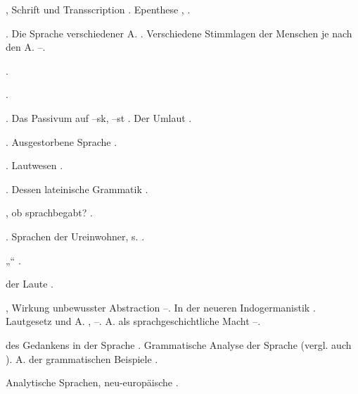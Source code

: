 \begin{register}
, Schrift und Transscription \pageref{sp.134}. Epenthese \pageref{sp.199}, \pageref{sp.401}.


. Die Sprache verschiedener A. \pageref{sp.258}. Verschiedene Stimmlagen der Menschen je nach den A. \pageref{sp.310}–\pageref{sp.311}.




 \pageref{sp.114}.

 \pageref{sp.160}.

. Das Passivum auf \mbox{–sk,} \mbox{–st} \pageref{sp.241}. Der Umlaut \pageref{sp.401}.

 \pageref{sp.114}. Ausgestorbene Sprache \pageref{sp.146}.

. Lautwesen \pageref{sp.34}.

. Dessen lateinische Grammatik \pageref{sp.106}.

, ob sprachbegabt? \pageref{sp.4}.

. Sprachen der Ureinwohner, s. .



„“ \pageref{sp.215}.

 der Laute \pageref{sp.200}.

, Wirkung unbewusster Abstraction \pageref{sp.63}–\pageref{sp.64}. In der neueren Indogermanistik \pageref{sp.137}. Lautgesetz und A. \pageref{sp.174}, \pageref{sp.186}–\pageref{sp.187}. A. als sprachgeschichtliche Macht \pageref{sp.210}–\pageref{sp.212}\sed{, \pageref{sp.211}}. 

 des Gedankens in der Sprache \sed{\pageref{sp.3},} \pageref{sp.81}. Grammatische Analyse der Sprache \pageref{sp.92} (vergl. auch ). A. der grammatischen Beispiele \pageref{sp.116}.

Analytische Sprachen, neu-europäische \pageref{sp.393}.



\end{register}

